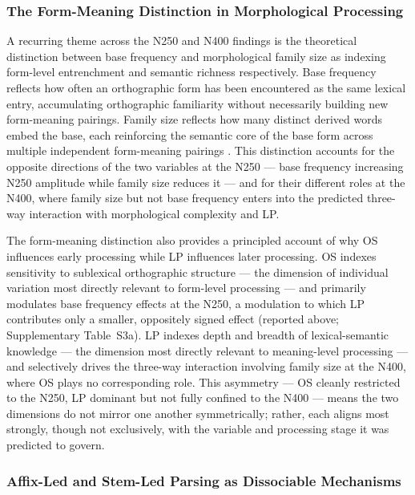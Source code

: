 \documentclass[utf8]{FrontiersinHarvard} %
\begin{document}
	\subsubsection{The Form-Meaning Distinction in Morphological Processing}
	
	A recurring theme across the N250 and N400 findings is the theoretical distinction between base frequency and morphological family size as indexing form-level entrenchment and semantic richness respectively. Base frequency reflects how often an orthographic form has been encountered as the same lexical entry, accumulating orthographic familiarity without necessarily building new form-meaning pairings. Family size reflects how many distinct derived words embed the base, each reinforcing the semantic core of the base form across multiple independent form-meaning pairings \citep{bolgerContextVariationDefinitions2008, liLearningNovelComplex2026}. This distinction accounts for the opposite directions of the two variables at the N250 --- base frequency increasing N250 amplitude while family size reduces it --- and for their different roles at the N400, where family size but not base frequency enters into the predicted three-way interaction with morphological complexity and LP.
	
	The form-meaning distinction also provides a principled account of why OS influences early processing while LP influences later processing. OS indexes sensitivity to sublexical orthographic structure --- the dimension of individual variation most directly relevant to form-level processing --- and primarily modulates base frequency effects at the N250, a modulation to which LP contributes only a smaller, oppositely signed effect (reported above; Supplementary Table~S3a). LP indexes depth and breadth of lexical-semantic knowledge --- the dimension most directly relevant to meaning-level processing --- and selectively drives the three-way interaction involving family size at the N400, where OS plays no corresponding role. This asymmetry --- OS cleanly restricted to the N250, LP dominant but not fully confined to the N400 --- means the two dimensions do not mirror one another symmetrically; rather, each aligns most strongly, though not exclusively, with the variable and processing stage it was predicted to govern.
	
	\subsubsection{Affix-Led and Stem-Led Parsing as Dissociable Mechanisms}
	
\end{document}
